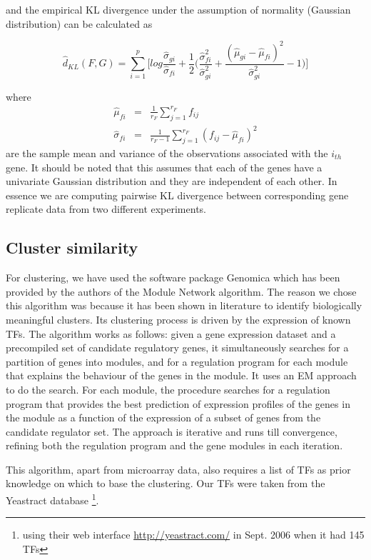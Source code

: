 and the empirical \ac{KL} divergence under the assumption of normality (Gaussian distribution) can be calculated as \citep{ernstwit2004statis_microarrays}

\[
\hat{d}_{KL}(F,G) = \sum_{i=1}^{p} \big[ log \frac{\hat{\sigma}_{gi}}{\hat{\sigma}_{fi}} + \frac{1}{2} \big( \frac{\hat{\sigma}_{fi}^2}{\hat{\sigma}_{gi}^2} + \frac{(\hat{\mu}_{gi}-\hat{\mu}_{fi})^2}{\hat{\sigma}_{gi}^2} -1 \big) \big]
\]
 
where 
\begin{eqnarray}
\hat{\mu}_{fi} &=& \frac{1}{r_{F}}\sum_{j=1}^{r_{F}}f_{ij} \\
\hat{\sigma}_{fi} &=& \frac{1}{r_{F}-1}\sum_{j=1}^{r_{F}}(f_{ij}-\hat{\mu}_{fi})^2
\end{eqnarray}
are the sample mean and variance of the observations associated with the $i_{th}$ gene. It should be noted that this assumes that each of the genes have a univariate Gaussian distribution and they are independent of each other. In essence we are computing pairwise \ac{KL} divergence between corresponding gene replicate data from two different experiments.

\subsection{Cluster similarity}\label{cluster_similarity}
For clustering, we have used the software package Genomica \citep{segal03module} which has been provided by the authors of the Module Network algorithm. The reason we chose this algorithm was because it has been shown in literature to identify biologically meaningful clusters. Its clustering process is driven by the expression of known TFs. The algorithm works as follows: given a gene expression dataset and a precompiled set of candidate regulatory genes, it simultaneously searches for a partition of genes into modules, and for a regulation program for each module that explains the behaviour of the genes in the module. It uses an \ac{EM} approach to do the search. For each module, the procedure searches for a regulation program that provides the best prediction of expression profiles of the genes in the module as a function of the expression of a subset of genes from the candidate regulator set. The approach is iterative and runs till convergence, refining both the regulation program and the gene modules in each iteration. 

This algorithm, apart from microarray data, also requires a list of \acp{TF} as prior knowledge on which to base the clustering. Our TFs were taken from the Yeastract database \citep{Teixeira06yeastract}\footnote{using their web interface \url{http://yeastract.com/} in Sept. 2006 when it had 145 TFs}. 

